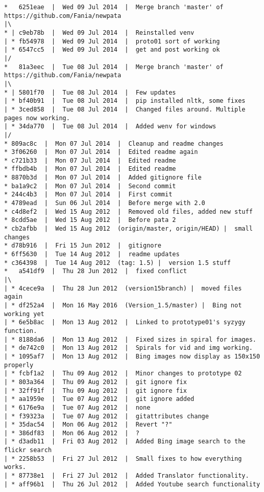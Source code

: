 \begin{verbatim}
*   6251eae  |  Wed 09 Jul 2014  |  Merge branch 'master' of https://github.com/Fania/newpata
|\  
* | c9eb78b  |  Wed 09 Jul 2014  |  Reinstalled venv
| * fb54978  |  Wed 09 Jul 2014  |  proto01 sort of working
| * 6547cc5  |  Wed 09 Jul 2014  |  get and post working ok
|/  
*   81a3eec  |  Tue 08 Jul 2014  |  Merge branch 'master' of https://github.com/Fania/newpata
|\  
* | 5801f70  |  Tue 08 Jul 2014  |  Few updates
| * bf40b91  |  Tue 08 Jul 2014  |  pip installed nltk, some fixes
| * 3ced858  |  Tue 08 Jul 2014  |  Changed files around. Multiple pages now working.
| * 34da770  |  Tue 08 Jul 2014  |  Added wenv for windows
|/  
* 809ac8c  |  Mon 07 Jul 2014  |  Cleanup and readme changes
* 3f06260  |  Mon 07 Jul 2014  |  Edited readme again
* c721b33  |  Mon 07 Jul 2014  |  Edited readme
* ffbdb4b  |  Mon 07 Jul 2014  |  Edited readme
* 8870b3d  |  Mon 07 Jul 2014  |  Added gitignore file
* ba1a9c2  |  Mon 07 Jul 2014  |  Second commit
* 244c4b3  |  Mon 07 Jul 2014  |  First commit
* 4789ead  |  Sun 06 Jul 2014  |  Before merge with 2.0
* c4d8ef2  |  Wed 15 Aug 2012  |  Removed old files, added new stuff
* 8cdd5ae  |  Wed 15 Aug 2012  |  Before pata 2
* cb2afbb  |  Wed 15 Aug 2012  (origin/master, origin/HEAD) |  small changes
* d78b916  |  Fri 15 Jun 2012  |  gitignore
* 6ff5630  |  Tue 14 Aug 2012  |  readme updates
* c364398  |  Tue 14 Aug 2012  (tag: 1.5) |  version 1.5 stuff
*   a541df9  |  Thu 28 Jun 2012  |  fixed conflict
|\  
| * 4cece9a  |  Thu 28 Jun 2012  (version15branch) |  moved files again
| * df252a4  |  Mon 16 May 2016  (Version_1.5/master) |  Bing not working yet
| * 6e5b8ac  |  Mon 13 Aug 2012  |  Linked to prototype01's syzygy function.
| * 8188da6  |  Mon 13 Aug 2012  |  Fixed sizes in spiral for images.
| * de742c0  |  Mon 13 Aug 2012  |  Spirals for vid and img working.
| * 1095af7  |  Mon 13 Aug 2012  |  Bing images now display as 150x150 properly
| * fcbf1a2  |  Thu 09 Aug 2012  |  Minor changes to prototype 02
| * 803a364  |  Thu 09 Aug 2012  |  git ignore fix
| * 32ff91f  |  Thu 09 Aug 2012  |  git ignore fix
| * aa1959e  |  Tue 07 Aug 2012  |  git ignore added
| * 6176e9a  |  Tue 07 Aug 2012  |  none
| * f39323a  |  Tue 07 Aug 2012  |  gitattributes change
| * 35dac54  |  Mon 06 Aug 2012  |  Revert "?"
| * 386df83  |  Mon 06 Aug 2012  |  ?
| * d3adb11  |  Fri 03 Aug 2012  |  Added Bing image search to the flickr search
| * 2258b53  |  Fri 27 Jul 2012  |  Small fixes to how everything works.
| * 87738e1  |  Fri 27 Jul 2012  |  Added Translator functionality.
| * aff96b1  |  Thu 26 Jul 2012  |  Added Youtube search functionality

\end{verbatim}

